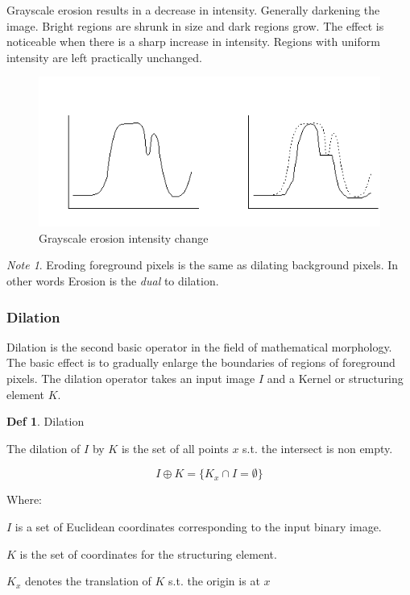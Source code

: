 \documentclass{article}
\theoremstyle{definition}
\newtheorem{df}{Def}
\theoremstyle{remark}
\newtheorem*{nb}{Note}
\begin{document}
Grayscale erosion results in a decrease in intensity. Generally darkening the image. Bright regions are shrunk in size and dark regions grow. The effect is noticeable when there is a sharp increase in intensity. Regions with uniform intensity are left practically unchanged.

\begin{figure}[h!]
    \centering
    \includegraphics[width=\textwidth]{eroding}
    \caption{Grayscale erosion intensity change}
    \label{fig:eroding}
\end{figure}


\begin{nb}
    Eroding foreground pixels is the same as dilating background pixels. In other words Erosion is the \textit{dual} to dilation.
\end{nb}


\break


\subsubsection{Dilation}

Dilation is the second basic operator in the field of mathematical morphology. The basic effect is to gradually enlarge the boundaries of regions of foreground pixels. The dilation operator takes an input image $ I $ and a Kernel or structuring element $ K $. 


\begin{df} Dilation

The dilation of $ I $ by $ K $ is the set of all points $ x $ s.t. the intersect is non empty.

\begin{equation}
    I \oplus K = \{ K_x \cap I = \emptyset \}
\end{equation}

\noindent Where:  

$ I $ is a set of Euclidean coordinates corresponding to the input binary image. 

$ K $ is the set of coordinates for the structuring element. 

$ K_x $ denotes the translation of $ K $ s.t. the origin is at $ x $

\end{df}
\end{document}
